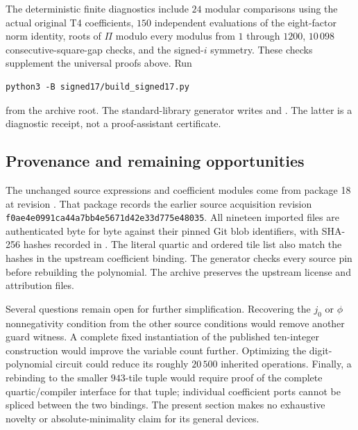 The deterministic finite diagnostics include $24$ modular comparisons
using the actual original T4 coefficients, $150$ independent evaluations
of the eight-factor norm identity, roots of $\Pi$ modulo every modulus
from $1$ through $1200$, $10\,098$ consecutive-square-gap checks, and
the signed-$i$ symmetry. These checks supplement the universal proofs
above. Run
\begin{lstlisting}
python3 -B signed17/build_signed17.py
\end{lstlisting}
from the archive root. The standard-library generator writes
 and
.
The latter is a diagnostic receipt, not a proof-assistant certificate.

\subsection{Provenance and remaining opportunities}

The unchanged source expressions and coefficient modules come from
package 18 at revision \pin. That package records the earlier source
acquisition revision
\texttt{f0ae4e0991ca44a7bb4e5671d42e33d775e48035}.
All nineteen imported files are authenticated byte for byte against
their pinned Git blob identifiers, with SHA-256 hashes recorded in
. The literal quartic and ordered tile
list also match the hashes in the upstream coefficient binding.
The generator checks every source pin before rebuilding the polynomial.
The archive preserves the upstream license and attribution files.

Several questions remain open for further simplification. Recovering
the $j_0$ or $\phi$ nonnegativity condition from the other source
conditions would remove another guard witness. A complete fixed
instantiation of the published ten-integer construction would improve
the variable count further. Optimizing the digit-polynomial circuit
could reduce its roughly $20\,500$ inherited operations. Finally, a
rebinding to the smaller $943$-tile tuple would require proof of the
complete quartic/compiler interface for that tuple; individual
coefficient ports cannot be spliced between the two bindings.
The present section makes no exhaustive novelty or absolute-minimality
claim for its general devices.
